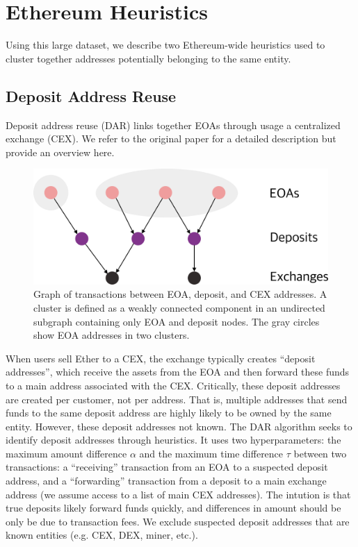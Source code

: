 \documentclass[11pt,a4paper]{article}
\begin{document}
\section{Ethereum Heuristics}

Using this large dataset, we describe two Ethereum-wide heuristics used to cluster together addresses potentially belonging to the same entity.

\subsection{Deposit Address Reuse}
\label{sec:dar}

Deposit address reuse (DAR) links together EOAs through usage a centralized exchange (CEX). We refer to the original paper \citep{victor2020address} for a detailed description but provide an overview here.

\begin{figure}[b!]
\includegraphics[width=\linewidth]{figures/dar.pdf}
\caption{Graph of transactions between EOA, deposit, and CEX addresses. A cluster is defined as a weakly connected component in an undirected subgraph containing only EOA and deposit nodes. The gray circles show EOA addresses in two clusters.}
\label{fig:dar}
\end{figure}

When users sell Ether to a CEX, the exchange typically creates ``deposit addresses'', which receive the assets from the EOA and then forward these funds to a main address associated with the CEX. Critically, these deposit addresses are created per customer, not per address. That is, multiple addresses that send funds to the same deposit address are highly likely to be owned by the same entity. However, these deposit addresses not known. The DAR algorithm seeks to identify deposit addresses through heuristics.
It uses two hyperparameters: the maximum amount difference $\alpha$ and the maximum time difference $\tau$ between two transactions: a ``receiving'' transaction from an EOA to a suspected deposit address, and a ``forwarding'' transaction from a deposit to a main exchange address (we assume access to a list of main CEX addresses). The intution is that true deposits likely forward funds quickly, and differences in amount should be only be due to transaction fees. We exclude suspected deposit addresses that are known entities (e.g. CEX, DEX, miner, etc.).
\end{document}
